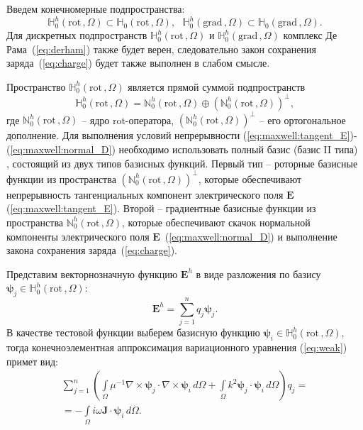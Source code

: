 \documentclass[a4paper,14pt]{article}
\begin{document}
Введем конечномерные подпространства:
\begin{equation*}
	\mathbb{H}_{0}^h( \mathrm{rot}\,, \Omega ) \subset \mathbb{H}_{0}( \mathrm{rot}\,, \Omega ) , \text{~~}
	\mathbb{H}_{0}^h( \mathrm{grad}\,, \Omega ) \subset \mathbb{H}_{0}( \mathrm{grad}\,, \Omega ) .
\end{equation*}
Для дискретных подпространств $\mathbb{H}_{0}^h( \mathrm{rot}\,, \Omega )$ и $\mathbb{H}_{0}^h( \mathrm{grad}\,, \Omega )$ комплекс Де Рама~(\ref{eq:derham}) также будет верен, следовательно закон сохранения заряда~(\ref{eq:charge}) будет также выполнен в слабом смысле.

Пространство $\mathbb{H}_{0}^h( \mathrm{rot}\,, \Omega )$ является прямой суммой подпространств~\citep{hiptmair,epov}
\begin{equation}
	\mathbb{H}_{0}^h( \mathrm{rot}\,, \Omega ) = \mathbb{N}_{0}^h( \mathrm{rot}\,, \Omega ) \oplus (\mathbb{N}_{0}^h( \mathrm{rot}\,, \Omega ))^{\bot} ,
	\label{eq:subspaces_sum}
\end{equation}
где $\mathbb{N}_{0}^h( \mathrm{rot}\,, \Omega )$ -- ядро rot-оператора, $(\mathbb{N}_{0}^h( \mathrm{rot}\,, \Omega ))^{\bot}$ -- его ортогональное дополнение. Для выполнения условий непрерывности (\ref{eq:maxwell:tangent_E})-(\ref{eq:maxwell:normal_D}) необходимо использовать полный базис (базис II типа) \citep{webb1993,webb1999,nedelec1980,nedelec1986,epov}, состоящий из двух типов базисных функций. Первый тип -- роторные базисные функции из пространства $(\mathbb{N}_{0}^h( \mathrm{rot}\,, \Omega ))^{\bot}$, которые обеспечивают непрерывность тангенциальных компонент электрического поля $\mathbf{E}$ (\ref{eq:maxwell:tangent_E}). Второй -- градиентные базисные функции из пространства $\mathbb{N}_{0}^h( \mathrm{rot}\,, \Omega )$, которые обеспечивают скачок нормальной компоненты электрического поля $\mathbf{E}$~(\ref{eq:maxwell:normal_D}) и выполнение закона сохранения заряда~(\ref{eq:charge}).

Представим векторнозначную функцию $\mathbf{E}^h$ в виде разложения по базису \linebreak $\boldsymbol{\psi}_j \in \mathbb{H}_{0}^h( \mathrm{rot}\,, \Omega )$:
\begin{equation*}
	\mathbf{E}^h = \sum\limits_{j = 1}^n q_j \boldsymbol{\psi}_j .
\end{equation*}
В качестве тестовой функции выберем базисную функцию $\boldsymbol{\psi}_i \in \mathbb{H}_{0}^h( \mathrm{rot}\,, \Omega )$, тогда конечноэлементная аппроксимация вариационного уравнения (\ref{eq:weak}) примет вид:
\begin{equation}
	\begin{array}{c} { \displaystyle
		\sum\limits_{j = 1}^n \left( \int\limits_\Omega \mu^{-1} \nabla \times \boldsymbol{\psi}_j \cdot \nabla \times \boldsymbol{\psi}_i \,d\Omega + \int\limits_\Omega k^{2} \boldsymbol{\psi}_j \cdot \boldsymbol{\psi}_i \,d\Omega \right) q_j =
	} \\ { \displaystyle
		=  - \int\limits_\Omega i \omega \mathbf{J} \cdot \boldsymbol{\psi}_i \,d\Omega .
	} \end{array}
	\label{eq:weak_discr}
\end{equation}
\end{document}
